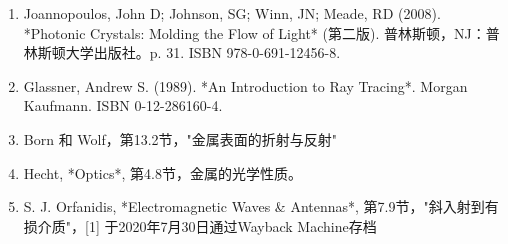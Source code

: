 \begin{enumerate}
\item Joannopoulos, John D; Johnson, SG; Winn, JN; Meade, RD (2008). *Photonic Crystals: Molding the Flow of Light* (第二版). 普林斯顿，NJ：普林斯顿大学出版社。p. 31. ISBN 978-0-691-12456-8.  
\item Glassner, Andrew S. (1989). *An Introduction to Ray Tracing*. Morgan Kaufmann. ISBN 0-12-286160-4.  
\item Born 和 Wolf，第13.2节，"金属表面的折射与反射"  
\item Hecht, *Optics*, 第4.8节，金属的光学性质。  
\item S. J. Orfanidis, *Electromagnetic Waves & Antennas*, 第7.9节，"斜入射到有损介质"，[1] 于2020年7月30日通过Wayback Machine存档
\end{enumerate}
